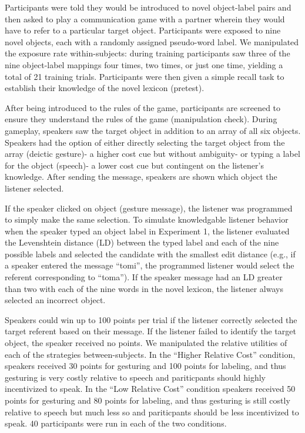 \documentclass[english,,man,floatsintext]{apa6}
\begin{document}
Participants were told they would be introduced to novel object-label pairs and then asked to play a communication game with a partner wherein they would have to refer to a particular target object. Participants were exposed to nine novel objects, each with a randomly assigned pseudo-word label. We manipulated the exposure rate within-subjects: during training participants saw three of the nine object-label mappings four times, two times, or just one time, yielding a total of 21 training trials. Participants were then given a simple recall task to establish their knowledge of the novel lexicon (pretest).

After being introduced to the rules of the game, participants are screened to ensure they understand the rules of the game (manipulation check). During gameplay, speakers saw the target object in addition to an array of all six objects. Speakers had the option of either directly selecting the target object from the array (deictic gesture)- a higher cost cue but without ambiguity- or typing a label for the object (speech)- a lower cost cue but contingent on the listener's knowledge. After sending the message, speakers are shown which object the listener selected.

If the speaker clicked on object (gesture message), the listener was programmed to simply make the same selection. To simulate knowledgable listener behavior when the speaker typed an object label in Experiment 1, the listener evaluated the Levenshtein distance (LD) between the typed label and each of the nine possible labels and selected the candidate with the smallest edit distance (e.g., if a speaker entered the message \enquote{tomi}, the programmed listener would select the referent corresponding to \enquote{toma}). If the speaker message had an LD greater than two with each of the nine words in the novel lexicon, the listener always selected an incorrect object.

Speakers could win up to 100 points per trial if the listener correctly selected the target referent based on their message. If the listener failed to identify the target object, the speaker received no points. We manipulated the relative utilities of each of the strategies between-subjects. In the \enquote{Higher Relative Cost} condition, speakers received 30 points for gesturing and 100 points for labeling, and thus gesturing is very costly relative to speech and pariticpants should highly incentivized to speak. In the \enquote{Low Relative Cost} condition speakers received 50 points for gesturing and 80 points for labeling, and thus gesturing is still costly relative to speech but much less so and pariticpants should be less incentivized to speak. 40 participants were run in each of the two conditions.
\end{document}
